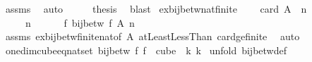 \begin{isabellebody}
\ assms{\isacharparenleft}{\kern0pt}{}{\isacharparenright}{\kern0pt}\ \isamarkupfalse%
\ auto\isanewline
\ \ \isamarkupfalse%
\ \isamarkupfalse%
\ {\isacharquery}{\kern0pt}thesis\ \isamarkupfalse%
\ blast\isanewline
{}\isamarkupfalse%
%
\endisatagproof
{\isafoldproof}%
%
\isadelimproof
\isanewline
%
\endisadelimproof
\isanewline
{}\isamarkupfalse%
\ ex{\isacharunderscore}{\kern0pt}bij{\isacharunderscore}{\kern0pt}betw{\isacharunderscore}{\kern0pt}nat{\isacharunderscore}{\kern0pt}finite{\isacharunderscore}{\kern0pt}{}{\isacharcolon}{\kern0pt}\ \isanewline
\ \ \ {\isachardoublequoteopen}card\ A\ {\isacharequal}{\kern0pt}\ n{\isachardoublequoteclose}\ \isanewline
\ \ \ \ \ {\isachardoublequoteopen}n\ {\isachargreater}{\kern0pt}\ {}{\isachardoublequoteclose}\ \isanewline
\ \ \ {\isachardoublequoteopen}{\isasymexists}f{\isachardot}{\kern0pt}\ bij{\isacharunderscore}{\kern0pt}betw\ f\ A\ {\isacharbraceleft}{\kern0pt}{\isachardot}{\kern0pt}{\isachardot}{\kern0pt}{\isacharless}{\kern0pt}n{\isacharbraceright}{\kern0pt}{\isachardoublequoteclose}\isanewline
%
\isadelimproof
\ \ %
\endisadelimproof
%
\isatagproof
{}\isamarkupfalse%
\ assms\ ex{\isacharunderscore}{\kern0pt}bij{\isacharunderscore}{\kern0pt}betw{\isacharunderscore}{\kern0pt}finite{\isacharunderscore}{\kern0pt}nat{\isacharbrackleft}{\kern0pt}of\ A{\isacharbrackright}{\kern0pt}\ atLeast{}LessThan\ card{\isacharunderscore}{\kern0pt}ge{\isacharunderscore}{\kern0pt}{}{\isacharunderscore}{\kern0pt}finite\ \isamarkupfalse%
\ auto%
\endisatagproof
{\isafoldproof}%
%
\isadelimproof
\isanewline
%
\endisadelimproof
\isanewline
{}\isamarkupfalse%
\ one{\isacharunderscore}{\kern0pt}dim{\isacharunderscore}{\kern0pt}cube{\isacharunderscore}{\kern0pt}eq{\isacharunderscore}{\kern0pt}nat{\isacharunderscore}{\kern0pt}set{\isacharcolon}{\kern0pt}\ {\isachardoublequoteopen}bij{\isacharunderscore}{\kern0pt}betw\ {\isacharparenleft}{\kern0pt}{\isasymlambda}f{\isachardot}{\kern0pt}\ f\ {}{\isacharparenright}{\kern0pt}\ {\isacharparenleft}{\kern0pt}cube\ {}\ k{\isacharparenright}{\kern0pt}\ {\isacharbraceleft}{\kern0pt}{\isachardot}{\kern0pt}{\isachardot}{\kern0pt}{\isacharless}{\kern0pt}k{\isacharbraceright}{\kern0pt}{\isachardoublequoteclose}\isanewline
%
\isadelimproof
%
\endisadelimproof
%
\isatagproof
{}\isamarkupfalse%
\ {\isacharparenleft}{\kern0pt}unfold\ bij{\isacharunderscore}{\kern0pt}betw{\isacharunderscore}{\kern0pt}def{\isacharparenright}{\kern0pt}\isanewline

\end{isabellebody}
